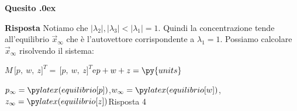 \documentclass[11pt,twoside,a4paper]{article}
\newcounter{quesito}
\newenvironment{question}{\bigskip\addtocounter{quesito}{1}\bigskip\bigskip\par\textbf{Quesito \thequesito.\kern0ex}}{\par\vspace{\parskip}}
\newenvironment{answer}{\par\textbf{Risposta\quad}}{\par\vspace{\parskip}}
\begin{document}
\begin{question}
\begin{answer}
Notiamo che $|\lambda_2|, |\lambda_3|<|\lambda_1|=1$. Quindi la concentrazione tende all'equilibrio $\vec x_\infty$ che è l'autovettore corrispondente a $\lambda_1=1$. Possiamo calcolare  $\vec x_\infty$ risolvendo il sistema:

\hfil$M\,\big[p,\ w,\ z\big]^T = \,\big[p,\ w,\ z\big]^T$\qquad e\qquad $p+w+z=\py{units}$



{\color{blue}$p_\infty=\pyl{equilibrio[p]}$,\quad $w_\infty=\pyl{equilibrio[w]}$,\quad $z_\infty=\pyl{equilibrio[z]}$\hfill Risposta 4} 
\end{answer}
\end{question}
\end{document}
